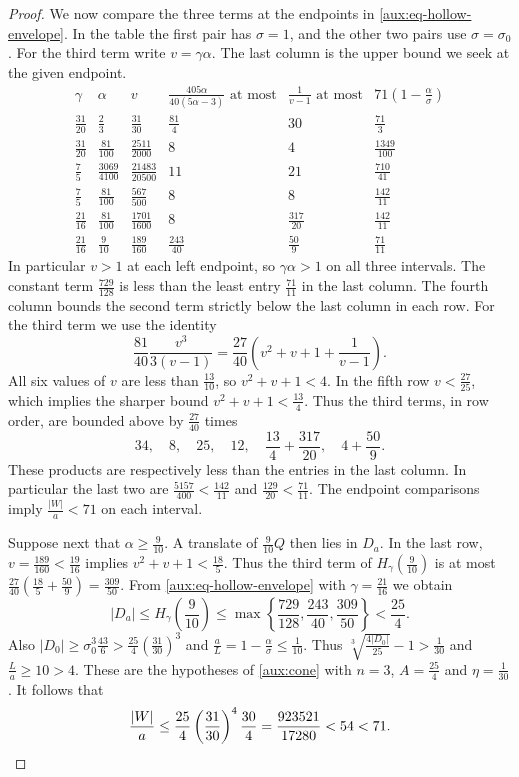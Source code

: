 \documentclass[reqno, 11pt]{article}
\numberwithin{equation}{section}
\theoremstyle{definition}
\begin{document}
\begin{proof}
We now compare the three terms at the endpoints in
\eqref{aux:eq-hollow-envelope}. In the table the first pair has
$\sigma=1$, and the other two pairs use $\sigma=\sigma_0$. For the
third term write $v=\gamma\alpha$. The last column is the upper bound
we seek at the given endpoint.
\[
\renewcommand{\arraystretch}{1.35}
\begin{array}{cc|ccc|c}
 \gamma&\alpha& v&
 \frac{405\alpha}{40(5\alpha-3)}\text{ at most}&
 \frac{1}{v-1}\text{ at most}& 71(1-\frac{\alpha}{\sigma})\\ \hline
 \frac{31}{20}&\frac{2}{3}&\frac{31}{30}&\frac{81}{4}&30&\frac{71}{3}\\
 \frac{31}{20}&\frac{81}{100}&\frac{2511}{2000}&8&4&\frac{1349}{100}\\
 \frac{7}{5}&\frac{3069}{4100}&\frac{21483}{20500}&11&21&\frac{710}{41}\\
 \frac{7}{5}&\frac{81}{100}&\frac{567}{500}&8&8&\frac{142}{11}\\
 \frac{21}{16}&\frac{81}{100}&\frac{1701}{1600}&8&\frac{317}{20}&\frac{142}{11}\\
 \frac{21}{16}&\frac{9}{10}&\frac{189}{160}&\frac{243}{40}&\frac{50}{9}&\frac{71}{11}
\end{array}
\]
In particular $v>1$ at each left endpoint, so $\gamma\alpha>1$ on
all three intervals. The constant term $\frac{729}{128}$ is less
than the least entry $\frac{71}{11}$ in the last column. The fourth
column bounds the second term strictly below the last column in each
row. For the third term we use the identity
\[
       \frac{81}{40}\frac{v^3}{3(v-1)}
       =\frac{27}{40}\left(v^2+v+1+\frac{1}{v-1}\right).
\]
All six values of $v$ are less than $\frac{13}{10}$, so
$v^2+v+1<4$. In the fifth row $v<\frac{27}{25}$, which implies the
sharper bound $v^2+v+1<\frac{13}{4}$. Thus the third terms, in row
order, are bounded above by $\frac{27}{40}$ times
\[
 34,\quad 8,\quad 25,\quad 12,\quad
 \frac{13}{4}+\frac{317}{20},\quad 4+\frac{50}{9}.
\]
These products are respectively less than the entries in the last
column. In particular the last two are $\frac{5157}{400}<\frac{142}{11}$
and $\frac{129}{20}<\frac{71}{11}$. The endpoint comparisons imply
$\frac{|W|}{a}<71$ on each interval.

Suppose next that $\alpha\ge\frac{9}{10}$. A translate of
$\frac{9}{10}Q$ then lies in $D_a$. In the last row,
$v=\frac{189}{160}<\frac{19}{16}$ implies $v^2+v+1<\frac{18}{5}$.
Thus the third term of $H_\gamma(\frac{9}{10})$ is at most
$\frac{27}{40}(\frac{18}{5}+\frac{50}{9})=\frac{309}{50}$.
From \eqref{aux:eq-hollow-envelope} with $\gamma=\frac{21}{16}$
we obtain
\[
 |D_a|\le H_\gamma\left(\frac{9}{10}\right)
 \le\max\left\{\frac{729}{128},\frac{243}{40},
              \frac{309}{50}\right\}<\frac{25}{4}.
\]
Also $|D_0|\ge\sigma_0^3\frac{43}{6}>\frac{25}{4}(\frac{31}{30})^3$
and $\frac{a}{L}=1-\frac{\alpha}{\sigma}\le\frac{1}{10}$. Thus
$\sqrt[3]{\frac{4|D_0|}{25}}-1>\frac{1}{30}$ and
$\frac{L}{a}\ge10>4$. These are the hypotheses of \eqref{aux:cone}
with $n=3$, $A=\frac{25}{4}$ and $\eta=\frac{1}{30}$. It follows that
\[
 \frac{|W|}{a}\le\frac{25}{4}\left(\frac{31}{30}\right)^4
                          \frac{30}{4}
              =\frac{923521}{17280}<54<71. \qedhere
\]
\end{proof}
\end{document}
